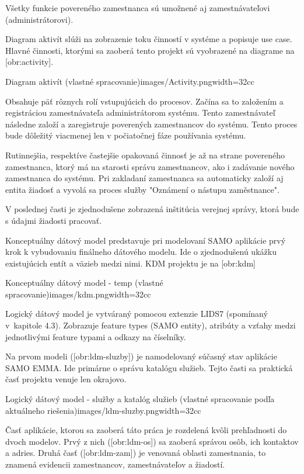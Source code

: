 Všetky funkcie povereného zamestnanca sú umožnené aj zamestnávateľovi (administrátorovi).


Diagram aktivít slúži na zobrazenie toku činností v systéme a popisuje use case. Hlavné činnosti, ktorými sa zaoberá tento projekt sú vyobrazené na diagrame na [obr:activity].

{Diagram aktivít (vlastné spracovanie)}{images/Activity.png}{width=32cc}

Obsahuje päť rôznych rolí vstupujúcich do procesov. Začína sa to založením a registráciou zamestnávateľa administrátorom systému. Tento zamestnávateľ následne založí a zaregistruje poverených zamestnancov do systému. Tento proces bude dôležitý viacmenej len v počiatočnej fáze používania systému. 

Rutinnejšia, respektíve častejšie opakovaná činnosť je až na strane povereného zamestnanca, ktorý má na starosti správu zamestnancov, ako i zadávanie nového zamestnanca do systému. Pri zakladaní zamestnanca sa automaticky založí aj entita žiadosť a vyvolá sa proces služby "Oznámení o nástupu zaměstnance".

V poslednej časti je zjednodušene zobrazená inštitúcia verejnej správy, ktorá bude s údajmi žiadosti pracovať.


Konceptuálny dátový model predstavuje pri modelovaní SAMO aplikácie prvý krok k vybudovaniu finálneho dátového modelu. Ide o zjednodušenú ukážku existujúcich entít a väzieb medzi nimi. KDM projektu je na [obr:kdm]

{Konceptuálny dátový model - temp (vlastné spracovanie)}{images/kdm.png}{width=32cc}

Logický dátový model je vytváraný pomocou extenzie LIDS7 (spomínaný v~kapitole 4.3). Zobrazuje feature types (SAMO entity), atribúty a vzťahy medzi jednotlivými feature typami a odkazy na číselníky.

Na prvom modeli ([obr:ldm-sluzby]) je namodelovaný súčasný stav aplikácie SAMO EMMA. Ide primárne o správu katalógu služieb. Tejto časti sa praktická časť projektu venuje len okrajovo.

{Logický dátový model - služby a katalóg služieb (vlastné spracovanie podľa aktuálneho riešenia)}{images/ldm-sluzby.png}{width=32cc}

Časť aplikácie, ktorou sa zaoberá táto práca je rozdelená kvôli prehľadnosti do dvoch modelov. Prvý z nich ([obr:ldm-os]) sa zaoberá správou osôb, ich kontaktov a adries. Druhá časť ([obr:ldm-zam]) je venovaná oblasti zamestnania, to znamená evidencii zamestnancov, zamestnávateľov a žiadostí.

